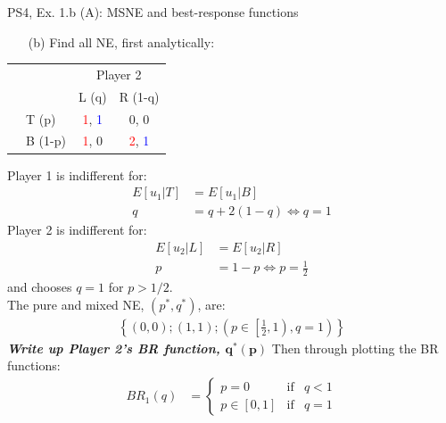 \begin{frame}{PS4, Ex. 1.b (A): MSNE and best-response functions}
  \begin{multicols}{2}
    \begin{itemize}
      \item[(b)] Find all NE, first analytically:
    \end{itemize}
    \begin{table}
      \begin{tabular}{cl|c|c|}
        & \multicolumn{1}{c}{} & \multicolumn{2}{c}{\color{blue}Player 2}\\
        \parbox[t]{1mm}{}
        &  &  &  \\
        & T (p) & \textcolor{red}{1}, \textcolor{blue}{1} & 0, 0 \\
        & B (1-p) & \textcolor{red}{1}, 0 & \textcolor{red}{2}, \textcolor{blue}{1} \\
      \end{tabular}
    \end{table}
    Player 1 is indifferent for:
    \begin{align*}
      E[u_1|T]&=E[u_1|B]\\
      q &= q + 2(1-q) \Leftrightarrow q = 1
    \end{align*}
    Player 2 is indifferent for:
    \begin{align*}
      E[u_2|L]&=E[u_2|R]\\
      p &= 1-p \Leftrightarrow p = \frac{1}{2}
    \end{align*}
    and chooses $q=1$ for $p>1/2$.\\\medskip
    The pure and mixed NE, $(p^{*},q^{*})$, are:
    \begin{align*}
      \left\{(0,0);(1,1);\left(p\in\left[\frac{1}{2},1\right),q=1\right)\right\}
    \end{align*}
    \textbf{\textit{Write up Player 2's BR function, $\bm{q^{*}(p)}$}}
  \vfill\null \columnbreak
    Then through plotting the BR functions:
    \vspace{-8pt}
    \begin{align*}
      BR_1(q)&=\left\{ \begin{array}{lcl}
          p=0       & \text{if} & q<1 \\
          p\in[0,1] & \text{if} & q=1
      \end{array}\right.\\

\end{align*}
\end{multicols}
\end{frame}
